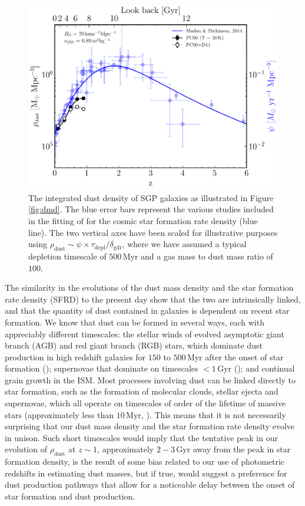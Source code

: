 \begin{figure}
	\centering
	\includegraphics[width=0.74\columnwidth]{Figures/Figure_3_9.pdf}
	\caption[Comparison of dust mass density and the cosmic star formation rate density]{The integrated dust density of SGP galaxies as illustrated in Figure \ref{fig:dmd}. The blue error bars represent the various studies included in the fitting of \citealt{Madau_2014} for the cosmic star formation rate density (blue line). The two vertical axes have been scaled for illustrative purposes using $\rho_{\textrm{dust}} \sim \psi \times\tau_{\textrm{depl}}/\delta_{\textrm{gdr}}$, where we have assumed a typical depletion timescale of $500\,$Myr and a gas mass to dust mass ratio of $100$.}
    \label{fig:sfrd}
\end{figure}

The similarity in the evolutions of the dust mass density and the star formation rate density (SFRD) to the present day show that the two are intrinsically linked, and that the quantity of dust contained in galaxies is dependent on recent star formation. We know that dust can be formed in several ways, each with appreciably different timescales: the stellar winds of evolved asymptotic giant branch (AGB) and red giant branch (RGB) stars, which dominate dust production in high redshift galaxies for $150$ to $500\,$Myr after the onset of star formation (\citealt{Valiante_2009}); supernovae that dominate on timescales $< 1\,$Gyr (\citealt{Dwek_2007}); and continual grain growth in the ISM. Most processes involving dust can be linked directly to star formation, such as the formation of molecular clouds, stellar ejecta and supernovae, which all operate on timescales of order of the lifetime of massive stars (approximately less than $10\,$Myr, \citealt{Galliano_2018}). This means that it is not necessarily surprising that our dust mass density and the star formation rate density evolve in unison. Such short timescales would imply that the tentative peak in our evolution of $\rho_{\textrm{dust}}$ at $z \sim 1$, approximately $2 - 3\,$Gyr away from the peak in star formation density, is the result of some bias related to our use of photometric redshifts in estimating dust masses, but if true, would suggest a preference for dust production pathways that allow for a noticeable delay between the onset of star formation and dust production.

